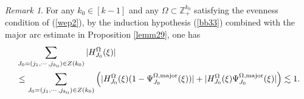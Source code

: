 \documentclass[11 pt,letterpaper]{amsart}
\theoremstyle{plain}
\theoremstyle{definition}
\theoremstyle{remark} \theoremstyle{exam} \theoremstyle{ob}
\newtheorem{remark}{Remark}\numberwithin{remark}{section}
\numberwithin{equation}{section}
\begin{document}
\begin{remark}\label{yu1}
 For any $ k_0\in  [k-1]$ and any $\Omega\subset \mathbb{Z}_+^{k_0}$  satisfying the evenness condition of (\ref{wep2}),	by the induction hypothesis (\ref{bb33}) combined with    the  major arc estimate in Proposition \ref{lemm29}, one has
	\begin{align*} 
		&\sum_{J_0=(j_1,\cdots,j_{k_0})\in  Z(k_0)} |H^{\Omega}_{J_0}(\xi)|\\
		&\le\sum_{J_0=(j_1,\cdots,j_{k_0})\in  Z(k_0)} \left(|H^{\Omega}_{J_0}(\xi)(1-\Psi^{\Omega,\rm{major}}_{J_0}(\xi))|+ |H^{\Omega}_{J_0}(\xi) \Psi^{\Omega,\rm{major}}_{J_0}(\xi)|\right) \lesssim 1. 
	\end{align*}

\end{remark}
\end{document}
